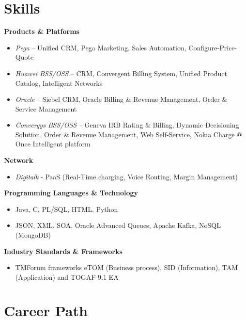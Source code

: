 \documentclass[line, margin]{res}
\begin{document}
\begin{resume}
		\section{Skills}
			{\bf Products \& Platforms}
			\begin{itemize}
			\item {\em Pega} \-– Unified CRM, Pega Marketing, Sales Automation, Configure\--Price\--Quote
			\item {\em Huawei BSS/OSS }\-– CRM, Convergent Billing System, Unified Product Catalog, Intelligent Networks
			\item {\em Oracle }\-–  Siebel CRM, Oracle Billing \& Revenue Management, Order \& Service Management
			\item {\em Convergys BSS/OSS }\-–  Geneva IRB Rating \& Billing, Dynamic Decisioning Solution, Order \& Revenue Management, Web Self-Service, Nokia Charge @ Once Intelligent platform
			\end{itemize}
			
						
			{\bf Network}
			\begin{itemize}
			\item	{\em Digitalk } \-- PaaS (Real-Time charging, Voice Routing, Margin Management)
			\end{itemize}
			
			{\bf  Programming Languages \& Technology}
			\begin{itemize}
			\item Java, C, PL/SQL, HTML, Python
			\item JSON, XML, SOA, Oracle Advanced Queues, Apache Kafka, NoSQL (MongoDB)
			\end{itemize}
			
			{\bf Industry Standards \& Frameworks}
			\begin{itemize}
			\item TMForum frameworks eTOM (Business process), SID (Information), TAM (Application) and TOGAF 9.1 EA
			\end{itemize}
		
	\section{Career Path}
	

\end{resume}
\end{document}
